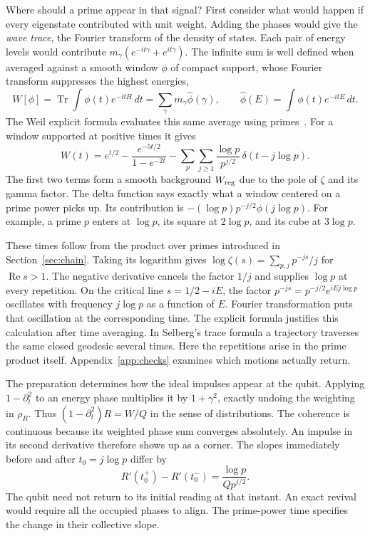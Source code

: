 \documentclass[11pt,letterpaper]{article}
\newcommand{\Tr}{\operatorname{Tr}}
\numberwithin{equation}{section}
\begin{document}
Where should a prime appear in that signal? First consider what would happen if every eigenstate contributed with unit weight. Adding the phases would give the \emph{wave trace}, the Fourier transform of the density of states. Each pair of energy levels would contribute $m_\gamma(e^{-it\gamma}+e^{it\gamma})$. The infinite sum is well defined when averaged against a smooth window $\phi$ of compact support, whose Fourier transform suppresses the highest energies,
\[
 W[\phi]=\Tr\!\int \phi(t)e^{-itH}\,dt
         =\sum_\gamma m_\gamma\widehat\phi(\gamma),
 \qquad \widehat\phi(E)=\int \phi(t)e^{-itE}\,dt .
\]
The Weil explicit formula evaluates this same average using primes~\cite{connesmarcolli}. For a window supported at positive times it gives
\begin{equation}
 W(t)=e^{t/2}-\frac{e^{-5t/2}}{1-e^{-2t}}
      -\sum_p\sum_{j\ge1}\frac{\log p}{p^{j/2}}\,\delta(t-j\log p).
 \label{eq:wave}
\end{equation}
The first two terms form a smooth background $W_{\rm reg}$ due to the pole of $\zeta$ and its gamma factor. The delta function says exactly what a window centered on a prime power picks up. Its contribution is $-(\log p)p^{-j/2}\phi(j\log p)$. For example, a prime $p$ enters at $\log p$, its square at $2\log p$, and its cube at $3\log p$.

These times follow from the product over primes introduced in Section~\ref{sec:chain}. Taking its logarithm gives $\log\zeta(s)=\sum_{p,j}p^{-js}/j$ for $\operatorname{Re}s>1$. The negative derivative cancels the factor $1/j$ and supplies $\log p$ at every repetition. On the critical line $s=1/2-iE$, the factor $p^{-js}=p^{-j/2}e^{iE j\log p}$ oscillates with frequency $j\log p$ as a function of $E$. Fourier transformation puts that oscillation at the corresponding time. The explicit formula justifies this calculation after time averaging. In Selberg's trace formula a trajectory traverses the same closed geodesic several times. Here the repetitions arise in the prime product itself. Appendix~\ref{app:checks} examines which motions actually return.

The preparation determines how the ideal impulses appear at the qubit. Applying $1-\partial_t^2$ to an energy phase multiplies it by $1+\gamma^2$, exactly undoing the weighting in $\rho_R$. Thus $(1-\partial_t^2)R=W/Q$ in the sense of distributions. The coherence is continuous because its weighted phase sum converges absolutely. An impulse in its second derivative therefore shows up as a corner. The slopes immediately before and after $t_0=j\log p$ differ by
\begin{equation}
 R'(t_0^+)-R'(t_0^-)=\frac{\log p}{Q p^{j/2}} .
 \label{eq:kink}
\end{equation}
The qubit need not return to its initial reading at that instant. An exact revival would require all the occupied phases to align. The prime-power time specifies the change in their collective slope.
\end{document}
